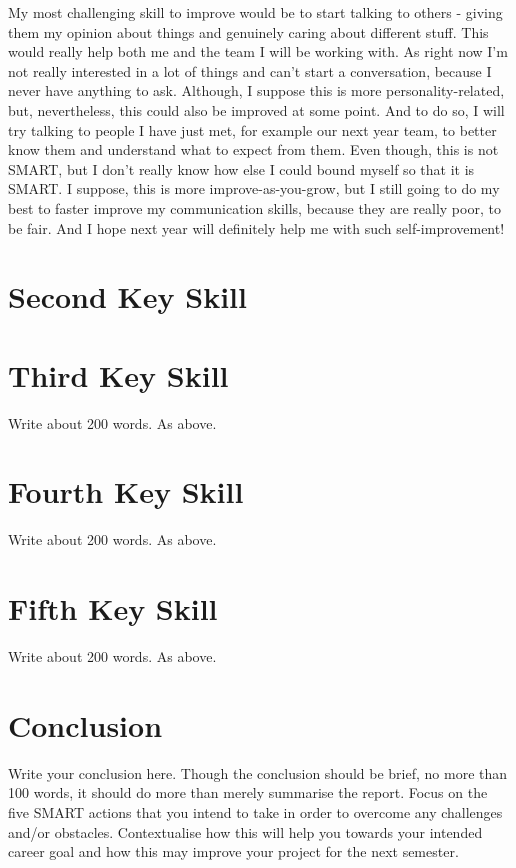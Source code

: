 \documentclass{scrartcl}
\begin{document}
My most challenging skill to improve would be to start talking to others - giving them my opinion about things and genuinely caring about different stuff. This would really help both me and the team I will be working with. As right now I'm not really interested in a lot of things and can't start a conversation, because I never have anything to ask. Although, I suppose this is more personality-related, but, nevertheless, this could also be improved at some point. And to do so, I will try talking to people I have just met, for example our next year team, to better know them and understand what to expect from them. Even though, this is not SMART, but I don't really know how else I could bound myself so that it is SMART. I suppose, this is more improve-as-you-grow, but I still going to do my best to faster improve my communication skills, because they are really poor, to be fair. And I hope next year will definitely help me with such self-improvement!

\section{Second Key Skill}



\section{Third Key Skill}

Write about 200 words. As above.

\section{Fourth Key Skill}

Write about 200 words. As above.

\section{Fifth Key Skill}

Write about 200 words. As above.

\section{Conclusion}

Write your conclusion here. Though the conclusion should be brief, no more than 100 words, it should do more than merely summarise the report. Focus on the five SMART actions that you intend to take in order to overcome any challenges and/or obstacles. Contextualise how this will help you towards your intended career goal and how this may improve your project for the next semester.



\end{document}
